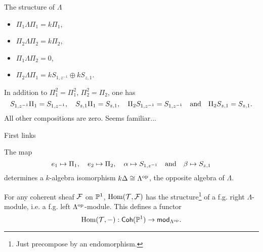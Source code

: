 \documentclass[
  xcolor=dvipsnames,
  aspectratio=169,
  compress
]{beamer}
\begin{document}
\begin{frame}{The structure of $\Lambda$}
  \begin{fact}
    \begin{itemize}
      \item $\Pi_1 \Lambda \Pi_1 = k \Pi_1$,
      \item $\Pi_2 \Lambda \Pi_2 = k \Pi_2$,
      \item $\Pi_1 \Lambda \Pi_2 = 0$,
      \item $\Pi_2 \Lambda \Pi_1 = k S_{1, z^{-1}} \oplus k S_{z, 1}$.
    \end{itemize}
  \end{fact}

  \pause

  In addition to $\Pi_1^2 = \Pi_1^2$, $\Pi_2^2 = \Pi_2$, one has
  \[
    S_{1, z^{-1}} \Pi_1 = S_{1, z^{-1}},
    \quad
    S_{z, 1} \Pi_1 = S_{z, 1},
    \quad
    \Pi_2 S_{1, z^{-1}} = S_{1, z^{-1}}
    \quad \text{and} \quad
    \Pi_2 S_{z, 1} = S_{z, 1}.
  \]
  All other compositions are zero.
  \pause
  Seems familiar...
\end{frame}

\begin{frame}{First links}
  \begin{fact}
    The map
    \[
      e_1 \mapsto \Pi_1,
      \quad
      e_2 \mapsto \Pi_2,
      \quad
      \alpha \mapsto S_{1, z^{-1}}
      \quad \text{and} \quad
      \beta \mapsto S_{z, 1}
    \]
    determines a $k$-algebra isomorphism $k \Delta \cong {\Lambda}^{\mathrm{op}}$, the \alert{opposite algebra} of $\Lambda$.
  \end{fact}

  \pause
  \begin{fact}
    For any coherent sheaf $\mathcal{F}$ on $\mathbb{P}^{{1}}$, $\operatorname{Hom}(\mathcal{T}, \mathcal{F})$ has the structure\footnote{Just precompose by an endomorphism.} of a f.g. \alert{right} $\Lambda$-module, i.e. a f.g. \alert{left} ${\Lambda}^{\mathrm{op}}$-module.
    This defines a functor
    \[
      \operatorname{Hom}(\mathcal{T}, -): \operatorname{\mathsf{Coh}}(\mathbb{P}^{{1}}) \to {\mathsf{mod}}_{{{\Lambda}^{\mathrm{op}}}}.
    \]
  \end{fact}
\end{frame}
\end{document}
